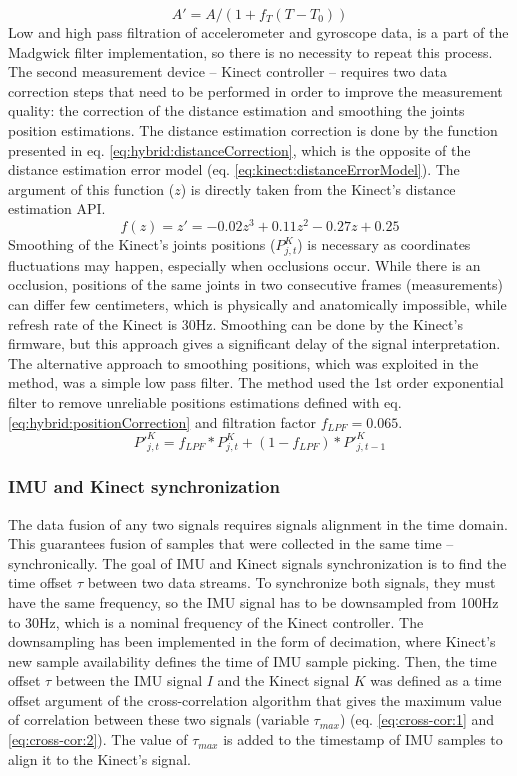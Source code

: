 \documentclass[sensors,article,submit,moreauthors,pdftex,10pt,a4paper]{mdpi}
\begin{document}
	\begin{equation}
		A'=A/(1+ f_T (T-T_0))
		\label{eq:hybrid:tempCorrection}
	\end{equation}
	Low and high pass filtration of accelerometer and gyroscope data, is a part of the Madgwick filter implementation, so there is no necessity to repeat this process.
	The second measurement device – Kinect controller – requires two data correction steps that need to be performed in order to improve the measurement quality: the correction of the distance estimation and smoothing the joints position estimations. The distance estimation correction is done by the function presented in eq. \ref{eq:hybrid:distanceCorrection}, which is the opposite of the distance estimation error model (eq. \ref{eq:kinect:distanceErrorModel}). The argument of this function ($z$) is directly taken from the Kinect’s distance estimation API.
	\begin{equation}
		f(z)=z'=-0.02z^3+0.11z^2-0.27z+0.25
		\label{eq:hybrid:distanceCorrection}
	\end{equation}
	Smoothing of the Kinect’s joints positions ($P_{j,t}^K$) is necessary as coordinates fluctuations may happen, especially when occlusions occur. While there is an occlusion, positions of the same joints in two consecutive frames (measurements) can differ few centimeters, which is physically and anatomically impossible, while refresh rate of the Kinect is 30Hz. Smoothing can be done by the Kinect’s firmware, but this approach gives a significant delay of the signal interpretation. The alternative approach to smoothing positions, which was exploited in the method, was a simple low pass filter. The method used the 1st order exponential filter to remove unreliable positions estimations defined with eq. \ref{eq:hybrid:positionCorrection} and filtration factor $f_{LPF} = 0.065$.
	\begin{equation}
		{P'}_{j,t}^K=f_{LPF} * P_{j,t}^K+(1-f_{LPF}) * {P'}_{j,t-1}^K
		\label{eq:hybrid:positionCorrection}
	\end{equation}
		
	\subsubsection{IMU and Kinect synchronization}
	The data fusion of any two signals requires signals alignment in the time domain. This guarantees fusion of samples that were collected in the same time -- synchronically. The goal of IMU and Kinect signals synchronization is to find the time offset $\tau$ between two data streams. To synchronize both signals, they must have the same frequency, so the IMU signal has to be downsampled from 100Hz to 30Hz, which is a nominal frequency of the Kinect controller. The downsampling has been implemented in the form of decimation, where Kinect’s new sample availability defines the time of IMU sample picking. Then, the time offset $\tau$ between the IMU signal $I$ and the Kinect signal $K$ was defined as a time offset argument of the cross-correlation algorithm that gives the maximum value of correlation between these two signals (variable $\tau_{max}$) (eq. \ref{eq:cross-cor:1} and \ref{eq:cross-cor:2}). The value of $\tau_{max}$ is added to the timestamp of IMU samples to align it to the Kinect’s signal.
		
\end{document}
